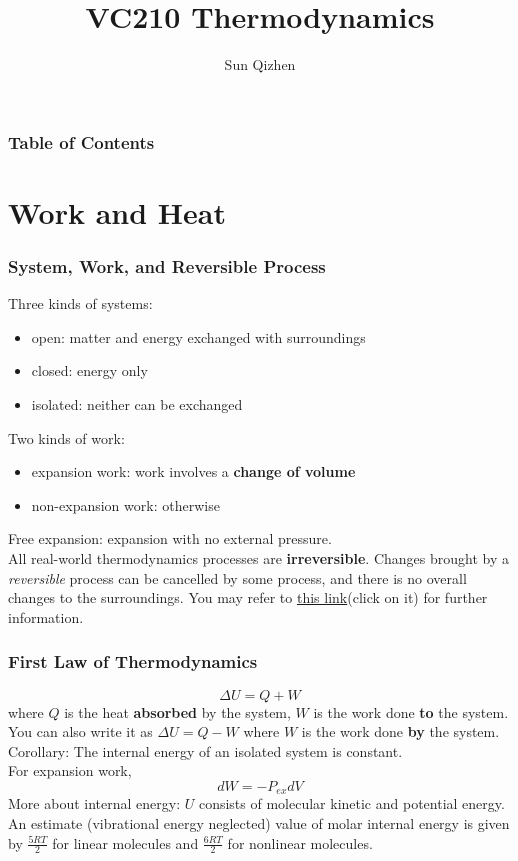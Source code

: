 \documentclass[aspectratio=169]{beamer}
\title[Course number]{VC210 Thermodynamics}
\author[]{Sun Qizhen}
\institute[UMJI-SJTU]
{
	University of Michigan - Shanghai Jiaotong University
	\\\medskip
	Joint Institute
}
\def\blankline{\\[6pt]}
\begin{document}
\maketitle
\begin{frame}
  \frametitle{Table of Contents}
  \tableofcontents
\end{frame}


\section{Work and Heat}
  \begin{frame}
  \frametitle{System, Work, and Reversible Process}
  Three kinds of systems:
  \begin{itemize}
    \item open: matter and energy exchanged with surroundings
    \item closed: energy only
    \item isolated: neither can be exchanged
  \end{itemize}
  Two kinds of work:
  \begin{itemize}
    \item expansion work: work involves a \textbf{change of volume}
    \item non-expansion work: otherwise
  \end{itemize}
  Free expansion: expansion with no external pressure.
  \blankline
  All real-world thermodynamics processes are \textbf{irreversible}. Changes brought by a \textit{reversible} 
  process can be cancelled by some process, and there is no overall changes to the surroundings. You may refer to \href{https://zhuanlan.zhihu.com/p/33133532}{this link}(click on it) for further information.

  \end{frame}
  \begin{frame}
    \frametitle{First Law of Thermodynamics}
    $$\Delta U = Q + W$$
    where $Q$ is the heat \textbf{absorbed} by the system, $W$ is the work done \textbf{to} the system. You can also write it as $\Delta U = Q - W$ where $W$ is the work done \textbf{by} the system.
    \blankline
    Corollary: The internal energy of an isolated system is constant.
    \blankline
    For expansion work, 
    $$dW = -P_{ex}dV$$
    More about internal energy: $U$ consists of molecular kinetic and potential energy. An estimate (vibrational energy neglected) 
    value of molar internal energy is given by $\frac{5RT}{2}$ for linear molecules and $\frac{6RT}{2}$ for nonlinear molecules. 
  \end{frame}
\end{document}
